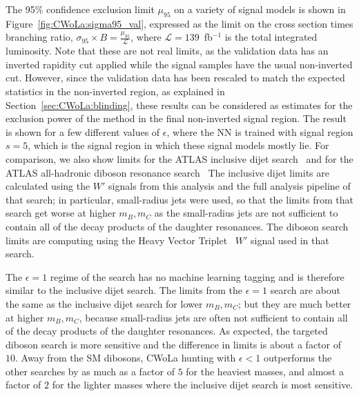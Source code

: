 The 95\% confidence exclusion limit $\mu_{95}$ on a variety of signal models is shown in Figure~\ref{fig:CWoLa:sigma95_val}, expressed as the limit on the cross section times branching ratio, $\sigma_{95}\times B = \frac{\mu_{95}}{\mathcal{L}}$, where $\mathcal{L} = 139$~fb$^{-1}$ is the total integrated luminosity.
Note that these are not real limits, as the validation data has an inverted rapidity cut applied while the signal samples have the usual non-inverted cut.
However, since the validation data has been rescaled to match the expected statistics in the non-inverted region, as explained in Section~\ref{sec:CWoLa:blinding}, these results can be considered as estimates for the exclusion power of the method in the final non-inverted signal region.
The result is shown for a few different values of $\epsilon$, where the NN is trained with signal region $s=5$, which is the signal region in which these signal models mostly lie.
For comparison, we also show limits for the ATLAS inclusive dijet search~\cite{Aad:2019hjw} and for the ATLAS all-hadronic diboson resonance search~\cite{Aad:2019fbh}
The inclusive dijet limits are calculated using the $W'$ signals from this analysis and the full analysis pipeline of that search;
in particular, small-radius jets were used, so that the limits from that search get worse at higher $m_B,m_C$ as the small-radius jets are not sufficient to contain all of the decay products of the daughter resonances.
The diboson search limits are computing using the Heavy Vector Triplet~\cite{Pappadopulo:2014qza} $W'$ signal used in that search.

The $\epsilon=1$ regime of the search has no machine learning tagging and is therefore similar to the inclusive dijet search.
The limits from the $\epsilon=1$ search are about the same as the inclusive dijet search for lower $m_B,m_C$; but they are much better at higher $m_B,m_C$, because small-radius jets are often not sufficient to contain all of the decay products of the daughter resonances.
As expected, the targeted diboson search is more sensitive and the difference in limits is about a factor of $10$.
Away from the SM dibosons, CWoLa hunting with $\epsilon<1$ outperforms the other searches by as much as a factor of $5$ for the heaviest masses, and almost a factor of $2$ for the lighter masses where the inclusive dijet search is most sensitive.

